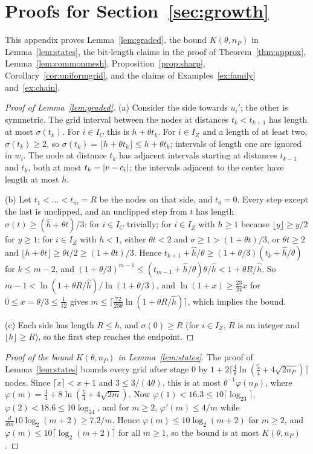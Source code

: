 \section{Proofs for Section~\ref{sec:growth}}\label{app:growth}

This appendix proves Lemma~\ref{lem:graded}, the bound $K(\theta,n_P)$ in
Lemma~\ref{lem:states}, the bit-length claims in the proof of
Theorem~\ref{thm:approx}, Lemma~\ref{lem:commonmesh},
Proposition~\ref{prop:sharp}, Corollary~\ref{cor:uniformgrid}, and the
claims of Examples~\ref{ex:family} and~\ref{ex:chain}.

\begin{proof}[Proof of Lemma~\ref{lem:graded}]
(a) Consider the side towards $u_i'$; the other is symmetric. The grid interval
between the nodes at distances $t_k<t_{k+1}$ has length at most $\sigma(t_k)$.
For $i\in I_C$ this is $h+\theta t_k$. For $i\in I_Z$ and a length of at least
two, $\sigma(t_k)\ge2$, so $\sigma(t_k)=\lfloor h+\theta t_k\rfloor\le h+\theta t_k$;
intervals of length one are ignored in $w_i$. The node at distance $t_k$ has
adjacent intervals starting at distances $t_{k-1}$ and $t_k$, both at most
$t_k=\lvert v-c_i\rvert$; the intervals adjacent to the center have length at most $h$.

(b) Let $t_1<\dots<t_m=R$ be the nodes on that side, and $t_0=0$. Every step
except the last is unclipped, and an unclipped step from $t$ has length
$\sigma(t)\ge(\hat h+\theta t)/3$: for $i\in I_C$ trivially; for $i\in I_Z$
with $h\ge1$ because $\lfloor y\rfloor\ge y/2$ for $y\ge1$; for $i\in I_Z$ with
$h<1$, either $\theta t<2$ and $\sigma\ge1>(1+\theta t)/3$, or $\theta t\ge2$
and $\lfloor h+\theta t\rfloor\ge\theta t/2\ge(1+\theta t)/3$. Hence
$t_{k+1}+\hat h/\theta\ge(1+\theta/3)(t_k+\hat h/\theta)$ for $k\le m-2$, and
$(1+\theta/3)^{m-1}\le(t_{m-1}+\hat h/\theta)\theta/\hat h<1+\theta R/\hat h$.
So $m-1<\ln(1+\theta R/\hat h)/\ln(1+\theta/3)$, and
$\ln(1+x)\ge\frac{23}{24}x$ for $0\le x=\theta/3\le\frac1{12}$ gives
$m\le\lceil\frac{72}{23\theta}\ln(1+\theta R/\hat h)\rceil$, which implies the
bound.

(c) Each side has length $R\le h$, and $\sigma(0)\ge R$ (for $i\in I_Z$, $R$ is
an integer and $\lfloor h\rfloor\ge R$), so the first step reaches the endpoint.
\end{proof}

\begin{proof}[Proof of the bound $K(\theta,n_P)$ in Lemma~\ref{lem:states}]
The proof of Lemma~\ref{lem:states} bounds every grid after stage $0$ by
$1+2\lceil\frac4\theta\ln(\frac54+4\sqrt{2n_P})\rceil$ nodes. Since
$\lceil x\rceil<x+1$ and $3\le3/(4\theta)$, this is at most
$\theta^{-1}\varphi(n_P)$, where
$\varphi(m)=\frac34+8\ln(\frac54+4\sqrt{2m})$. Now
$\varphi(1)<16.3\le10\lceil\log_23\rceil$, $\varphi(2)<18.6\le10\log_24$, and
for $m\ge2$, $\varphi'(m)\le4/m$ while
$\frac{d}{dm}10\log_2(m+2)\ge7.2/m$. Hence $\varphi(m)\le10\log_2(m+2)$ for
$m\ge2$, and $\varphi(m)\le10\lceil\log_2(m+2)\rceil$ for all $m\ge1$, so
the bound is at most $K(\theta,n_P)$.
\end{proof}

